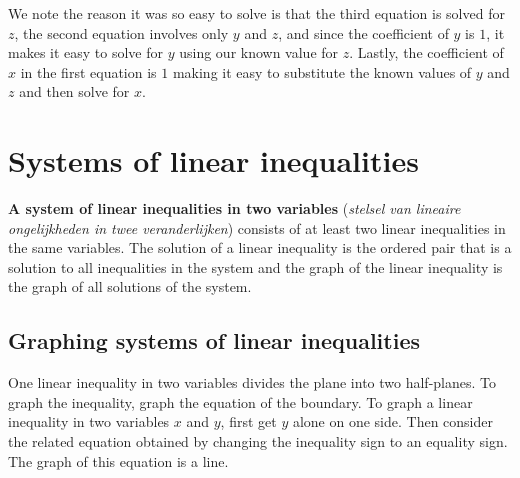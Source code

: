 \begin{example}

We note the reason it was so easy to solve is that the third equation is solved for $z$, the second equation involves only $y$ and $z$, and since the coefficient of $y$ is $1$, it makes it easy to solve for $y$ using our known value for $z$.  Lastly, the coefficient of  $x$ in the first equation is $1$ making it easy to substitute the known values of $y$ and $z$ and then solve for $x$.  


\end{example}








\section{Systems of linear inequalities}\label{syst_lin_ineq}
%
%

\textbf{A system of linear inequalities in two variables} (\textit{stelsel van lineaire ongelijkheden in twee veranderlijken}) consists of at least two linear inequalities in the same variables. The solution of a linear inequality is the ordered pair that is a solution to all inequalities in the system and the graph of the linear inequality is the graph of all solutions of the system. \\



\subsection{Graphing systems of linear inequalities} \label{graphing_syst_lin_ineq}
One linear inequality in two variables divides the plane into two half-planes. To graph the inequality, graph the equation of the boundary. To graph a linear inequality in two variables $x$ and $y$, first get $y$ alone on one side. Then consider the related equation obtained by changing the inequality sign to an equality sign. The graph of this equation is a line.\\

